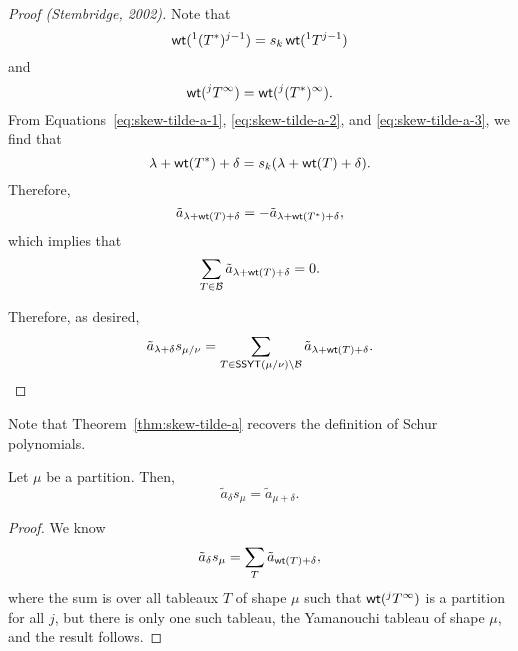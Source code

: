 \begin{proof}[Proof (Stembridge, 2002)]
    Note that
    \begin{equation} \label{eq:skew-tilde-a-2}
        \operatorname{\mathsf{wt}}(^1(T^*)^{j-1}) = s_k \operatorname{\mathsf{wt}}(^1T^{j-1})
    \end{equation}
    and
    \begin{equation} \label{eq:skew-tilde-a-3}
        \operatorname{\mathsf{wt}}(^jT^\infty) = \operatorname{\mathsf{wt}}(^j(T^*)^\infty).
    \end{equation}
    From Equations~\eqref{eq:skew-tilde-a-1}, \eqref{eq:skew-tilde-a-2}, and \eqref{eq:skew-tilde-a-3}, we find that
    \begin{equation}
        \lambda + \operatorname{\mathsf{wt}}(T^*) + \delta = s_k(\lambda + \operatorname{\mathsf{wt}}(T) + \delta).
    \end{equation}
    Therefore,
    \begin{equation}
        \tilde{a}_{\lambda + \operatorname{\mathsf{wt}}(T) + \delta}
        =
        - \tilde{a}_{\lambda + \operatorname{\mathsf{wt}}(T^*) + \delta},
    \end{equation}
    which implies that
    \begin{equation}
        \sum_{T \in \mathcal{B}} \tilde{a}_{\lambda + \operatorname{\mathsf{wt}}(T) + \delta} = 0.
    \end{equation}

    Therefore, as desired,
    \begin{equation}
        \tilde{a}_{\lambda + \delta} s_{\mu/\nu}
        =
        \sum_{T \in \operatorname{\mathsf{SSYT}}(\mu/\nu) \setminus \mathcal{B}}
        \tilde{a}_{\lambda + \operatorname{\mathsf{wt}}(T) + \delta}.
    \end{equation}
\end{proof}

Note that Theorem~\ref{thm:skew-tilde-a} recovers the definition of Schur polynomials.

\begin{corollary}
    Let \(\mu\) be a partition.
    Then,
    \begin{equation}
        \tilde{a}_{\delta} s_\mu = \tilde{a}_{\mu + \delta}.
    \end{equation}
\end{corollary}

\begin{proof}
    We know
    \begin{equation}
        \tilde{a}_{\delta} s_\mu = \sum_{T} \tilde{a}_{\operatorname{\mathsf{wt}}(T) + \delta},
    \end{equation}
    where the sum is over all tableaux \(T\) of shape \(\mu\) such that \(\operatorname{\mathsf{wt}}(^jT^\infty)\) is a partition for all \(j\),
    but there is only one such tableau, the Yamanouchi tableau of shape \(\mu\),
    and the result follows.
\end{proof}

